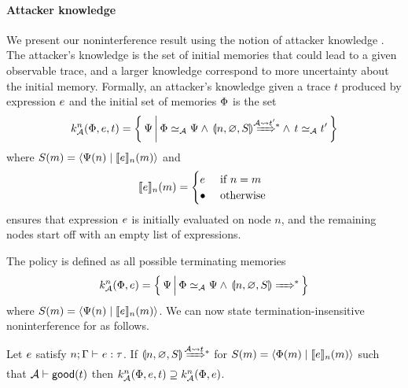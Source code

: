 \paragraph{Attacker knowledge}
We present our noninterference result using the notion of attacker knowledge \cite{Askarov:2008:TNL:1462455.1462485, 4223226}. The attacker's knowledge is the set of initial memories that could lead to a given observable trace, and a larger knowledge correspond to more uncertainty about the initial memory. Formally, an attacker's knowledge given a trace $t$ produced by expression $e$ and the initial set of memories $\Phi$ is the set
\begin{equation*}
k^n_{\Attacker}(\globalstore, \expr, t) = \left\{ \, \altglobalstore \, \middle\vert \, \globalstore \simeq_{\Attacker} \altglobalstore \wedge \, \gconfig{n}{\emptyenv}{S} \gstepstos[][\Attacker \filtertrace t'] \wedge \, t \simeq_{\Attacker} t' \, \right\}
\end{equation*}
where $S(m) = \langle \Psi(n) \mid \llbracket e \rrbracket_n(m) \rangle$ and
\begin{equation*}
\llbracket e \rrbracket_n(m) =
\begin{cases}
e & \text{ if } n = m\\
\bullet & \text{ otherwise }
\end{cases}
\end{equation*}
ensures that expression $e$ is initially evaluated on node $n$, and the remaining nodes start off with an empty list of expressions.

The policy \cite{6234468} is defined as all possible terminating memories
\begin{equation*}
k^n_{\Attacker}(\globalstore, \expr) = \left\{ \,\altglobalstore \, \middle\vert \, \globalstore \simeq_{\Attacker} \altglobalstore \wedge \, \gconfig{n}{\emptyenv}{S} \gstepstos \, \right\}
\end{equation*}
where $S(m) = \langle \Psi(n) \mid \llbracket e \rrbracket_n(m) \rangle$. We can now state termination-insensitive noninterference for \lang{} as follows.

\begin{theorem}[Noninterference]\label{thm:ni}
Let $e$ satisfy $\hastype{n; \tenv}{\expr}{\type}$.
If $\gconfig{n}{\varnothing}{S} \gstepstos[][\Attacker \filtertrace t]$ for $S(m) = \langle \Phi(m) \mid \llbracket e \rrbracket_n(m) \rangle$ such that $\mathcal{A} \vdash \mathsf{good}(t)$ then $k^n_{\mathcal{A}}(\Phi, e, t) \supseteq k^n_{\mathcal{A}}(\Phi, e)$.
\end{theorem}

